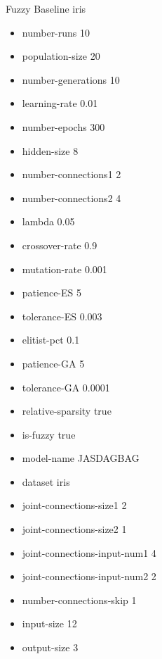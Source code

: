 Fuzzy Baseline
iris
\begin{itemize}
\item number-runs 10
\item population-size 20
\item number-generations 10
\item learning-rate 0.01
\item number-epochs 300
\item hidden-size 8
\item number-connections1 2
\item number-connections2 4
\item lambda 0.05
\item crossover-rate 0.9
\item mutation-rate 0.001
\item patience-ES 5
\item tolerance-ES 0.003
\item elitist-pct 0.1
\item patience-GA 5
\item tolerance-GA 0.0001
\item relative-sparsity true
\item is-fuzzy true
\item model-name JASDAGBAG
\item dataset iris
\item joint-connections-size1 2
\item joint-connections-size2 1
\item joint-connections-input-num1 4
\item joint-connections-input-num2 2
\item number-connections-skip 1
\item input-size 12
\item output-size 3
\end{itemize}

